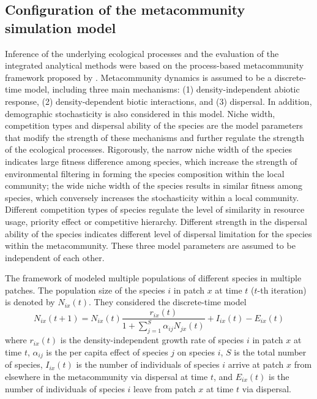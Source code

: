 	\subsection{Configuration of the metacommunity simulation model}
	\noindent
	Inference of the underlying ecological processes and the evaluation of the integrated analytical methods were based on the process-based metacommunity framework proposed by \citet{thompson2020process}. Metacommunity dynamics is assumed to be a discrete-time model, including three main mechanisms: (1) density-independent abiotic response, (2) density-dependent biotic interactions, and (3) dispersal. In addition, demographic stochasticity is also considered in this model. Niche width, competition types and dispersal ability of the species are the model parameters that modify the strength of these mechanisms and further regulate the strength of the ecological processes. Rigorously, the narrow niche width of the species indicates large fitness difference among species, which increase the strength of environmental filtering in forming the species composition within the local community; the wide niche width of the species results in similar fitness among species, which conversely increases the stochasticity within a local community. Different competition types of species regulate the level of similarity in resource usage, priority effect or competitive hierarchy. Different strength in the dispersal ability of the species indicates different level of dispersal limitation for the species within the metacommunity. These three model parameters are assumed to be independent of each other. 
	
	The framework of \citet{thompson2020process} modeled multiple populations of different species in multiple patches. The population size of the species $i$ in patch $x$ at time $t$ ($t$-th iteration) is denoted by $N_{ix}(t)$. They considered the discrete-time model
	\[
	N_{ix}(t+1) = N_{ix}(t)\dfrac{r_{ix}(t)}{1+\sum_{j = 1}^S\alpha_{ij}N_{jx}(t)} + I_{ix}(t) - E_{ix}(t)
	\]
	where 
	$r_{ix}(t)$ is the density-independent growth rate of species $i$ in patch $x$ at time $t$, $\alpha_{ij}$ is the per capita effect of species $j$ on species $i$, $S$ is the total number of species, $I_{ix}(t)$ is the number of individuals of species $i$ arrive at patch $x$ from elsewhere in the metacommunity via dispersal at time $t$, and $E_{ix}(t)$ is the number of individuals of species $i$ leave from patch $x$ at time $t$ via dispersal.
	
